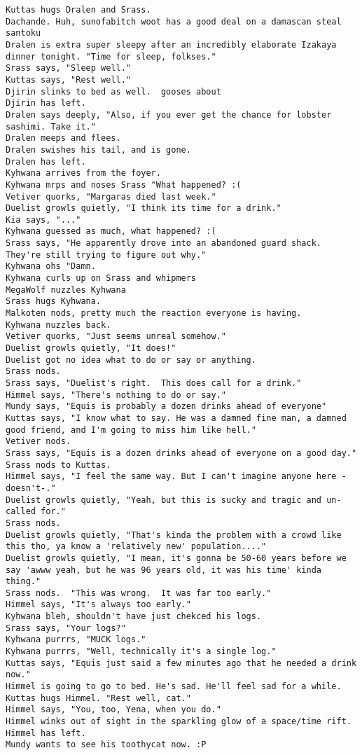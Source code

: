 \begin{verbatim}
Kuttas hugs Dralen and Srass.
Dachande. Huh, sunofabitch woot has a good deal on a damascan steal santoku
Dralen is extra super sleepy after an incredibly elaborate Izakaya dinner tonight. "Time for sleep, folkses."
Srass says, "Sleep well."
Kuttas says, "Rest well."
Djirin slinks to bed as well.  gooses about
Djirin has left.
Dralen says deeply, "Also, if you ever get the chance for lobster sashimi. Take it."
Dralen meeps and flees.
Dralen swishes his tail, and is gone.
Dralen has left.
Kyhwana arrives from the foyer.
Kyhwana mrps and noses Srass "What happened? :(
Vetiver quorks, "Margaras died last week."
Duelist growls quietly, "I think its time for a drink."
Kia says, "..."
Kyhwana guessed as much, what happened? :(
Srass says, "He apparently drove into an abandoned guard shack.  They're still trying to figure out why."
Kyhwana ohs "Damn.
Kyhwana curls up on Srass and whipmers
MegaWolf nuzzles Kyhwana
Srass hugs Kyhwana.
Malkoten nods, pretty much the reaction everyone is having.
Kyhwana nuzzles back.
Vetiver quorks, "Just seems unreal somehow."
Duelist growls quietly, "It does!"
Duelist got no idea what to do or say or anything.
Srass nods.
Srass says, "Duelist's right.  This does call for a drink."
Himmel says, "There's nothing to do or say."
Mundy says, "Equis is probably a dozen drinks ahead of everyone"
Kuttas says, "I know what to say. He was a damned fine man, a damned good friend, and I'm going to miss him like hell."
Vetiver nods.
Srass says, "Equis is a dozen drinks ahead of everyone on a good day."
Srass nods to Kuttas.
Himmel says, "I feel the same way. But I can't imagine anyone here -doesn't-."
Duelist growls quietly, "Yeah, but this is sucky and tragic and un-called for."
Srass nods.
Duelist growls quietly, "That's kinda the problem with a crowd like this tho, ya know a 'relatively new' population...."
Duelist growls quietly, "I mean, it's gonna be 50-60 years before we say 'awww yeah, but he was 96 years old, it was his time' kinda thing."
Srass nods.  "This was wrong.  It was far too early."
Himmel says, "It's always too early."
Kyhwana bleh, shouldn't have just chekced his logs.
Srass says, "Your logs?"
Kyhwana purrrs, "MUCK logs."
Kyhwana purrrs, "Well, technically it's a single log."
Kuttas says, "Equis just said a few minutes ago that he needed a drink now."
Himmel is going to go to bed. He's sad. He'll feel sad for a while.
Kuttas hugs Himmel. "Rest well, cat."
Himmel says, "You, too, Yena, when you do."
Himmel winks out of sight in the sparkling glow of a space/time rift.
Himmel has left.
Mundy wants to see his toothycat now. :P

\end{verbatim}
